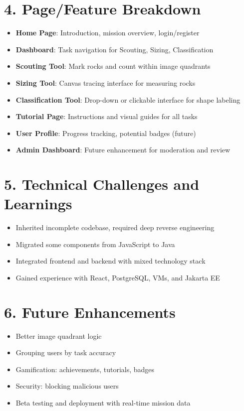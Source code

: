\documentclass[12pt]{article}
\begin{document}
\section*{4. Page/Feature Breakdown}
\begin{itemize}
  \item \textbf{Home Page}: Introduction, mission overview, login/register
  \item \textbf{Dashboard}: Task navigation for Scouting, Sizing, Classification
  \item \textbf{Scouting Tool}: Mark rocks and count within image quadrants
  \item \textbf{Sizing Tool}: Canvas tracing interface for measuring rocks
  \item \textbf{Classification Tool}: Drop-down or clickable interface for shape labeling
  \item \textbf{Tutorial Page}: Instructions and visual guides for all tasks
  \item \textbf{User Profile}: Progress tracking, potential badges (future)
  \item \textbf{Admin Dashboard}: Future enhancement for moderation and review
\end{itemize}

\section*{5. Technical Challenges and Learnings}
\begin{itemize}
  \item Inherited incomplete codebase, required deep reverse engineering
  \item Migrated some components from JavaScript to Java
  \item Integrated frontend and backend with mixed technology stack
  \item Gained experience with React, PostgreSQL, VMs, and Jakarta EE
\end{itemize}

\section*{6. Future Enhancements}
\begin{itemize}
  \item Better image quadrant logic
  \item Grouping users by task accuracy
  \item Gamification: achievements, tutorials, badges
  \item Security: blocking malicious users
  \item Beta testing and deployment with real-time mission data
\end{itemize}
\end{document}
